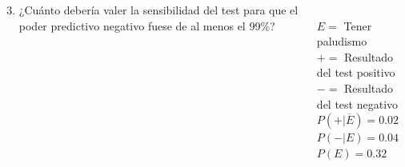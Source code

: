 \documentclass[aspectratio=149,10pt,xcolor=dvipsnames,t]{beamer}
\begin{document}
\begin{frame}
\begin{columns}
\begin{column}[T]{0.6\textwidth}
\begin{enumerate}
\setcounter{enumi}{2}
\item ¿Cuánto debería valer la sensibilidad del test para que el poder predictivo negativo fuese de al menos el 99\%?
\end{enumerate}
\end{column}
\begin{column}[T]{0.4\textwidth}
\\
$E=$ Tener paludismo\\
$+=$ Resultado del test positivo\\
$-=$ Resultado del test negativo\\
$P(+|\overline{E})=0.02$\\
$P(-|E) = 0.04$\\
$P(E)=0.32$
\end{column}
\end{columns}
\end{frame}
\end{document}
